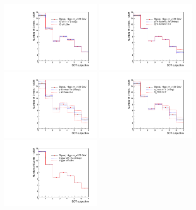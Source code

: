 \begin{figure}
\begin{center}
  \includegraphics[width=0.45\textwidth]{hgg7TeV/sidebandMvaPlots/signalModel/systematic_interpolation_test_idEff.pdf}
  \includegraphics[width=0.45\textwidth]{hgg7TeV/sidebandMvaPlots/signalModel/systematic_interpolation_test_kFactor}\\
  \includegraphics[width=0.45\textwidth]{hgg7TeV/sidebandMvaPlots/signalModel/systematic_interpolation_test_phoIdMva}
  \includegraphics[width=0.45\textwidth]{hgg7TeV/sidebandMvaPlots/signalModel/systematic_interpolation_test_regSig}\\
  \includegraphics[width=0.45\textwidth]{hgg7TeV/sidebandMvaPlots/signalModel/systematic_interpolation_test_triggerEff}

\end{center}
\end{figure}
